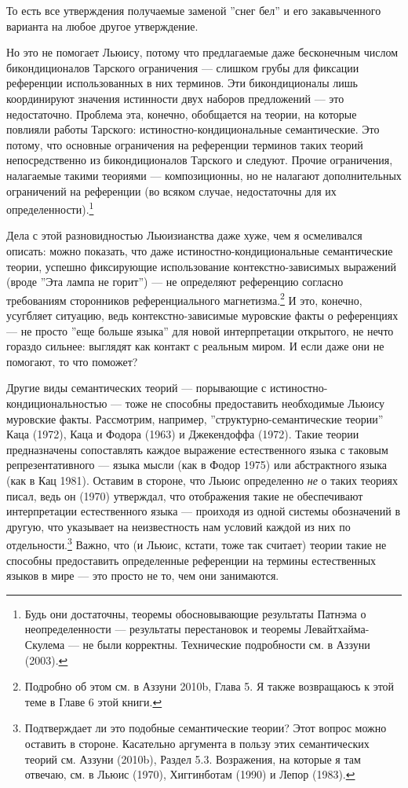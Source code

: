 \documentclass[11pt]{book}
\begin{document}
То есть все утверждения получаемые заменой ''снег бел'' и его закавыченного варианта на любое другое утверждение.

Но это не помогает Льюису, потому что предлагаемые даже бесконечным числом бикондиционалов Тарского ограничения --- слишком грубы для фиксации референции использованных в них терминов. Эти бикондиционалы лишь координируют значения истинности двух наборов предложений --- это недостаточно. Проблема эта, конечно, обобщается на теории, на которые повлияли работы Тарского: истиностно-кондициональные семантические. Это потому, что основные ограничения на референции терминов таких теорий непосредственно из бикондиционалов Тарского и следуют. Прочие ограничения, налагаемые такими теориями --- композиционны, но не налагают дополнительных ограничений на референции (во всяком случае, недостаточны для их определенности).\footnote{Будь они достаточны, теоремы обосновывающие результаты Патнэма о неопределенности --- результаты перестановок и теоремы Левайтхайма-Скулема --- не были корректны. Технические подробности см. в Аззуни (2003).}

Дела с этой разновидностью Льюизианства даже хуже, чем я осмеливался описать: можно показать, что даже истиностно-кондициональные семантические теории, успешно фиксирующие использование контекстно-зависимых выражений (вроде ''Эта лампа не горит'') --- не определяют референцию согласно требованиям сторонников референциального магнетизма.\footnote{Подробно об этом см. в Аззуни 2010b, Глава 5. Я также возвращаюсь к этой теме в Главе 6 этой книги.} И это, конечно, усугбляет ситуацию, ведь контекстно-зависимые муровские факты о референциях --- не просто ''еще больше языка'' для новой интерпретации открытого, не нечто гораздо сильнее: выглядят как контакт с реальным миром. И если даже они не помогают, то что поможет?

Другие виды семантических теорий --- порывающие с истиностно-кондициональностью --- тоже не способны предоставить необходимые Льюису муровские факты. Рассмотрим, например, ''структурно-семантические теории'' Каца (1972), Каца и Фодора (1963) и Джекендоффа (1972). Такие теории предназначены сопоставлять каждое выражение естественного языка с таковым репрезентативного --- языка мысли (как в Фодор 1975) или абстрактного языка (как в Кац 1981). Оставим в стороне, что Льюис определенно \textit{не} о таких теориях писал, ведь он (1970) утверждал, что отображения такие не обеспечивают интерпретации естественного языка --- проиходя из одной системы обозначений в другую, что указывает на неизвестность нам условий каждой из них по отдельности.\footnote{Подтверждает ли это подобные семантические теории? Этот вопрос можно оставить в стороне. Касательно аргумента в пользу этих семантических теорий см. Аззуни (2010b), Раздел 5.3. Возражения, на которые я там отвечаю, см. в Льюис (1970), Хиггинботам (1990) и Лепор (1983).} Важно, что (и Льюис, кстати, тоже так считает) теории такие не способны предоставить определенные референции на термины естественных языков в мире --- это просто не то, чем они занимаются.
\end{document}
